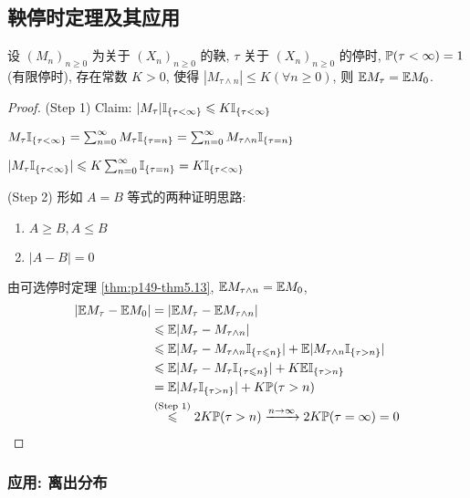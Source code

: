 \subsection{鞅停时定理及其应用}

\begin{theorem}[鞅停时定理]\label{thm:p150-thm5.14}
    设 $(M_n)_{n\geq 0}$ 为关于 $(X_n)_{n\geq 0}$ 的鞅, $\tau$ 关于 $(X_n)_{n\geq 0}$ 的停时, $\mathbb{P}(\tau<\infty)=1$ (有限停时), 存在常数 $K>0$, 使得 $|M_{\tau\land n}|\leq K (\forall n\geq 0)$, 则 $\mathbb E M_{\tau}=\mathbb E M_0$.
\end{theorem}

\begin{proof}
    (Step 1) Claim: $|M_{\tau}|\mathbb I_{\{\tau<\infty\}}\leqslant K\mathbb I_{\{\tau<\infty\}}$

    $M_{\tau}\mathbb I_{\{\tau<\infty\}}=\sum_{n=0}^{\infty}M_{\tau}\mathbb I_{\{\tau=n\}}=\sum_{n=0}^{\infty} M_{\tau\land n}\mathbb I_{\{\tau=n\}}$

    $|M_{\tau}\mathbb I_{\{\tau<\infty\}}|\leqslant K\sum_{n=0}^{\infty}\mathbb I_{\{\tau=n\}}=K\mathbb I_{\{\tau<\infty\}}$

    (Step 2) 形如 $A=B$ 等式的两种证明思路: 
    \begin{enumerate}
        \item $A\geq B, A\leq B$
        \item $|A-B|=0$
    \end{enumerate}
    由可选停时定理 \ref{thm:p149-thm5.13}, $\mathbb E M_{\tau\land n}=\mathbb E M_0$,
    \[
    \begin{aligned}
        |\mathbb E M_{\tau}-\mathbb E M_0| &= |\mathbb E M_{\tau} -\mathbb E M_{\tau\land n}|\\
        &\leqslant \mathbb E |M_{\tau} - M_{\tau\land n}|\\
        &\leqslant \mathbb E |M_{\tau}-M_{\tau\land n}\mathbb I_{\{\tau\leqslant n\}}|+\mathbb E |M_{\tau\land n}\mathbb I_{\{\tau>n\}}|\\
        &\leqslant \mathbb E |M_{\tau}-M_{\tau}\mathbb I_{\{\tau\leqslant n\}}|+K\mathbb E \mathbb I_{\{\tau>n\}}\\
        &=\mathbb E |M_{\tau}\mathbb I_{\{\tau >n\}}| +K\mathbb{P}(\tau>n)\\
        &\overset{\text{(Step 1)}}{\leqslant} 2K\mathbb{P}(\tau>n)\xrightarrow{n\to\infty}2K\mathbb{P}(\tau=\infty)=0
    \end{aligned}
    \]
\end{proof}

\subsubsection{应用: 离出分布}

